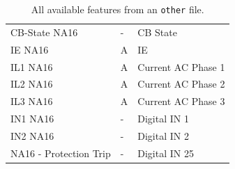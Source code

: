 \begin{table}[H]
\begin{center}
\begin{tabular}[c]{l|l|l}
			CB-State NA16                             & -  & CB State           \\
			IE NA16                                   & A  & IE                 \\
			IL1 NA16                                  & A  & Current AC Phase 1 \\
			IL2 NA16                                  & A  & Current AC Phase 2 \\
			IL3 NA16                                  & A  & Current AC Phase 3 \\
			IN1 NA16                                  & -  & Digital IN 1       \\
			IN2 NA16                                  & -  & Digital IN 2       \\
			NA16 - Protection Trip                    & -  & Digital IN 25      \\
			\hline
		\end{tabular}
		\caption{All available features from an \texttt{other} file.}\label{tab:otherfeatures}
	\end{center}
\end{table}
